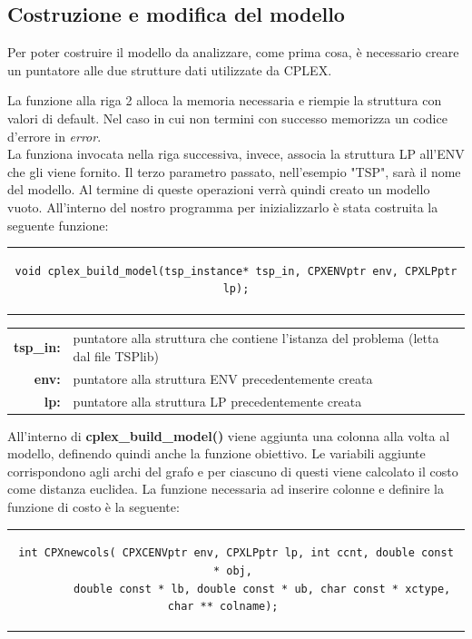 \subsection{Costruzione e modifica del modello}
Per poter costruire il modello da analizzare, come prima cosa, è necessario creare un puntatore alle due strutture dati utilizzate da CPLEX.

La funzione alla riga 2 alloca la memoria necessaria e riempie la struttura con valori di default. Nel caso in cui non termini con successo memorizza un codice d'errore in \textit{error}.\\
La funziona invocata nella riga successiva, invece, associa la struttura LP all'ENV che gli viene fornito. Il terzo parametro passato, nell'esempio "TSP", sarà il nome del modello. Al termine di queste operazioni verrà quindi creato un modello vuoto. All'interno del nostro programma per inizializzarlo è stata costruita la seguente funzione:
\begin{center}
\begin{tabular}{c}
\begin{lstlisting}[linewidth=370pt, basicstyle=\footnotesize\sffamily,] 
void cplex_build_model(tsp_instance* tsp_in, CPXENVptr env, CPXLPptr lp);
\end{lstlisting}
\end{tabular}
\end{center}
\begin{table}[h]
\centering
\begin{tabular}{rl}
\textbf{tsp\_in: } & {puntatore alla struttura che contiene l'istanza del problema (letta dal file TSPlib)} \\
\textbf{env: } & {puntatore alla struttura ENV precedentemente creata}\\
\textbf{lp: } & {puntatore alla struttura LP  precedentemente creata}\\
\end{tabular}
\end{table}
All'interno di \textbf{cplex\_build\_model()} viene aggiunta una colonna alla volta al modello, definendo quindi anche la funzione obiettivo. Le variabili aggiunte corrispondono agli archi del grafo e per ciascuno di questi viene calcolato il costo come distanza euclidea. La funzione necessaria ad inserire colonne e definire la funzione di costo è la seguente:
\begin{center}
\begin{tabular}{c}
\begin{lstlisting}[linewidth=400pt, basicstyle=\footnotesize\sffamily,] 
int CPXnewcols( CPXCENVptr env, CPXLPptr lp, int ccnt, double const * obj, 
		double const * lb, double const * ub, char const * xctype, char ** colname);    
\end{lstlisting}
\end{tabular}
\end{center}
